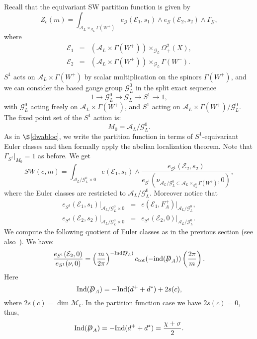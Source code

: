 \documentclass[a4paper,12pt,reqno,sumlimits]{amsart}
\theoremstyle{plain}
\theoremstyle{definition}
\newcommand{\1}{{\bf 1}}
\newcommand{\calA}{{\mathcal A}}
\newcommand{\calE}{{\mathcal E}}
\newcommand{\calG}{{\mathcal G}}
\newcommand{\calM}{{\mathcal M}}
\renewcommand{\to}{\longrightarrow}
\newcommand{\Dirac}{\not\!\!D}
\newcommand{\ind}{{\operatorname{ind}}}
\newcommand{\Ind}{{\operatorname{Ind}}}
\numberwithin{equation}{section}
\begin{document}
Recall that the equivariant SW partition function is given by
$$
Z_c(m)=\int_{\calA_L\times_{\calG_L}\Gamma(W^+)}
e_{\calG}(\calE_1,s_1)\wedge e_{\calG}(\calE_2,s_2)\wedge\Gamma_{\calG},
$$
where
\begin{eqnarray*}
  \calE_1&=&\left(\calA_L\times\Gamma(W^+)\right)\times_{\calG_L}
  \Omega^2_+(X),\\
  \calE_2&=&\left(\calA_L\times\Gamma(W^+)\right)\times_{\calG_L}
  \Gamma(W^-).\\
\end{eqnarray*}
$S^1$ acts on $\calA_L\times\Gamma(W^+)$ by scalar multiplication
on the spinors $\Gamma(W^+)$, and we can consider the based gauge group
$\calG_L^0$ in the split exact sequence
$$
1\to\calG_L^0\to\calG_L\to S^1\to 1,
$$
with $\calG_L^0$ acting freely on $\calA_L\times\Gamma(W^+)$, and $S^1$
acting on $\calA_L\times\Gamma(W^+)/\calG_L^0$.  The fixed point set of the
$S^1$ action is:
$$
M_0=\calA_L/\calG_L^0.
$$
As in $\S$\ref{dwabloc}, we write the partition function in terms of
$S^1$-equivariant Euler classes and then formally apply the abelian
localization theorem.  Note that $\Gamma_{S^1}\big|_{M_0}=1$ as before.  We
get
\begin{equation*}
  SW(c,m)=\int_{\calA_L/\calG_L^0\times 0} 
  e(\calE_1,s_1)\wedge\frac{e_{S^1}(\calE_2,s_2)}
  {e_{S^1}(\nu_{\calA_L/\calG_L^0\subset\calA_L
      \times_{\calG_L^0}\Gamma(W^+)},0)},
\end{equation*} 
where the Euler classes are restricted to $\calA_L/\calG_L^0$. Moreover
notice that
\begin{eqnarray*}
  e_{S^1}(\calE_1,s_1)\big|_{\calA_L/\calG_L^0\times 0}&=&
  e(\calE_1,F_A^+)\big|_{\calA_L/\calG_L^0},\\
  e_{S^1}(\calE_2,s_2)\big|_{\calA_L/\calG_L^0\times 0}&=&
  e_{S^1}(\calE_2,0)\big|_{\calA_L/\calG_L^0}.
\end{eqnarray*}
We compute the following quotient of Euler classes as in the previous section
(see also~\cite[Prop. 69]{radu}). We have:
$$
\frac{e_{S^1}(\calE_2,0)}{e_{S^1}(\nu,0)}=
\left(\frac{m}{2\pi}\right)^{-\text{Ind}({\Dirac}_A)}
c_{\text{tot}}(-\ind({\Dirac}_A))\left(\frac{2\pi}{m}\right).
$$
Here
\begin{equation}
  \Ind({\Dirac}_A)=-\Ind(d^++d^*)+2s(c),
\end{equation}
where $2s(c)=\dim\calM_c$.  In the partition function case we have
$2s(c)=0$, thus,
\begin{equation}
  \label{diracindex}
  \Ind({\Dirac}_A)=-\Ind(d^++d^*)=\frac{\chi+\sigma}{2}.
\end{equation}
\end{document}
